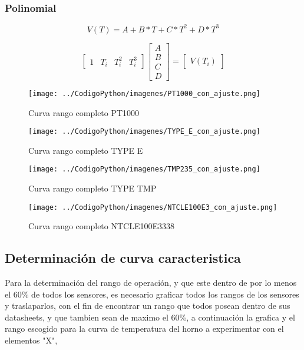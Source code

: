 \documentclass[conference]{IEEEtran}
\begin{document}
\subsubsection{Polinomial}
\[
	V(T) = A + B * T + C * T^2 + D * T^3
\]

\[
\begin{bmatrix} 
	1 & T_i & T_{i}^2 & T_i^3 
\end{bmatrix}
\begin{bmatrix} 
	A \\ 
	B \\
	C \\
	D
\end{bmatrix}
= 
\begin{bmatrix} 
	V(T_{i})
\end{bmatrix}
\]



\begin{figure}[h!]
	\centering
	\texttt{[image: ../CodigoPython/imagenes/PT1000\_con\_ajuste.png]}
	\caption{Curva rango completo PT1000}
	\label{fig:1}
\end{figure}

\begin{figure}[h!]
	\centering
	\texttt{[image: ../CodigoPython/imagenes/TYPE\_E\_con\_ajuste.png]}
	\caption{Curva rango completo TYPE E}
	\label{fig:2}
\end{figure}

\begin{figure}[h!]
	\centering
	\texttt{[image: ../CodigoPython/imagenes/TMP235\_con\_ajuste.png]}
	\caption{Curva rango completo TYPE TMP}
	\label{fig:3}
\end{figure}

\begin{figure}[h!]
	\centering
	\texttt{[image: ../CodigoPython/imagenes/NTCLE100E3\_con\_ajuste.png]}
	\caption{Curva rango completo NTCLE100E3338}
	\label{fig:4}
\end{figure}




\subsection{Determinación de curva caracteristica}

Para la determinación del rango de operación, y que este dentro de por lo menos el 60\% de todos los sensores, es necesario graficar todos los rangos de los sensores y traslaparlos, con el fin de encontrar un rango que todos posean dentro de sus datasheets, y que tambien sean de maximo el 60\%, a continuación la grafica y el rango escogido para la curva de temperatura del horno a experimentar con el elementos "X",
\end{document}
